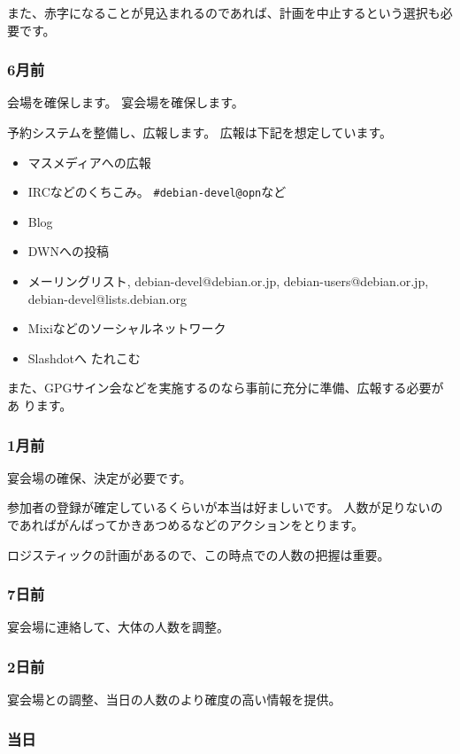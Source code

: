 \documentclass[mingoth,a4paper]{jsarticle}
\begin{document}
また、赤字になることが見込まれるのであれば、計画を中止するという選択も必
要です。

\subsubsection{6月前}

会場を確保します。
宴会場を確保します。

予約システムを整備し、広報します。
広報は下記を想定しています。

\begin{itemize}
 \item マスメディアへの広報
 \item IRCなどのくちこみ。
       \verb!#debian-devel@opn!など
 \item Blog
 \item DWNへの投稿
 \item メーリングリスト, debian-devel@debian.or.jp,
       debian-users@debian.or.jp, debian-devel@lists.debian.org
 \item Mixiなどのソーシャルネットワーク
 \item Slashdotへ たれこむ
\end{itemize}

また、GPGサイン会などを実施するのなら事前に充分に準備、広報する必要があ
ります。

\subsubsection{1月前}

宴会場の確保、決定が必要です。

参加者の登録が確定しているくらいが本当は好ましいです。
人数が足りないのであればがんばってかきあつめるなどのアクションをとります。

ロジスティックの計画があるので、この時点での人数の把握は重要。

\subsubsection{7日前}

宴会場に連絡して、大体の人数を調整。

\subsubsection{2日前}

宴会場との調整、当日の人数のより確度の高い情報を提供。

\subsubsection{当日}
\end{document}
